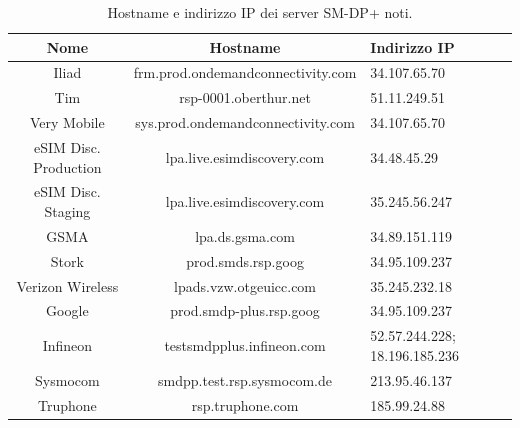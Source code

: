 \documentclass[10pt, oneside]{book}
\begin{document}
\begin{table}[h!]
\begin{center}
\captionsetup{skip=4pt}
\caption{Hostname e indirizzo IP dei server SM-DP+ noti.}
\label{tab:IP-addr}
\begin{tabularx}{\textwidth}{|c|c|X|} %
\hline
\textbf{Nome} & \textbf{Hostname} & \textbf{Indirizzo IP}\\
\hline
Iliad & frm.prod.ondemandconnectivity.com & 34.107.65.70\\
\hline
Tim & rsp-0001.oberthur.net & 51.11.249.51\\
\hline
Very Mobile & sys.prod.ondemandconnectivity.com & 34.107.65.70\\
\hline
eSIM Disc. Production & lpa.live.esimdiscovery.com & 34.48.45.29\\
\hline
eSIM Disc. Staging & lpa.live.esimdiscovery.com & 35.245.56.247\\
\hline
GSMA & lpa.ds.gsma.com & 34.89.151.119\\
\hline
Stork & prod.smds.rsp.goog & 34.95.109.237\\
\hline
Verizon Wireless & lpads.vzw.otgeuicc.com & 35.245.232.18\\
\hline
Google & prod.smdp-plus.rsp.goog & 34.95.109.237\\
\hline
Infineon & testsmdpplus.infineon.com & 52.57.244.228; 18.196.185.236 \\
\hline
Sysmocom & smdpp.test.rsp.sysmocom.de & 213.95.46.137\\
\hline
Truphone & rsp.truphone.com & 185.99.24.88\\
\hline
\end{tabularx}
\end{center}
\end{table}
\end{document}
